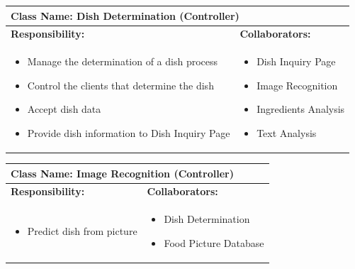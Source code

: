 \documentclass[]{article}
\begin{document}
\begin{table}[H]
	\centering
	\begin{tabular}{|p{7cm}|p{7cm}|}
	\hline 
	 \multicolumn{2}{|l|}{\textbf{Class Name: Dish Determination (Controller)}} \\
	\hline
	\textbf{Responsibility:} & \textbf{Collaborators:} \\
	\hline
	\raggedright
	\begin{itemize}
		\item Manage the determination of a dish process
		\item Control the clients that determine the dish
		\item Accept dish data
		\item Provide dish information to Dish Inquiry Page
	\end{itemize}
	\vspace{1in} & 
	\begin{itemize}
		\item Dish Inquiry Page
		\item Image Recognition
		\item Ingredients Analysis
		\item Text Analysis
	\end{itemize} \\
	\hline
	\end{tabular}
\end{table}

\begin{table}[H]
	\centering
	\begin{tabular}{|p{7cm}|p{7cm}|}
	\hline 
	 \multicolumn{2}{|l|}{\textbf{Class Name: Image Recognition (Controller)}} \\
	\hline
	\textbf{Responsibility:} & \textbf{Collaborators:} \\
	\hline
	\raggedright
	\begin{itemize}
		\item Predict dish from picture
	\end{itemize}
	\vspace{1in} & 
	\begin{itemize}
		\item Dish Determination
		\item Food Picture Database
	\end{itemize} \\
	\hline
	\end{tabular}
\end{table}
\end{document}
